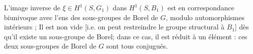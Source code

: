 L'image inverse de $\xi\in H^1(S,G_1)$ dans $H^1(S,B_1)$ est en correspondance biunivoque avec l'ens des sous-groupes de Borel de $G$, modulo automorphismes intérieurs ; Il est non vide [i.e. on peut restreindre le groupe structural à $B_1$] dès qu'il existe un sous-groupe de Borel; dans ce cas, il est réduit à un élément :  ces deux sous-groupes de Borel de $G$ sont tous conjugués. 


\margin{$\times$}
